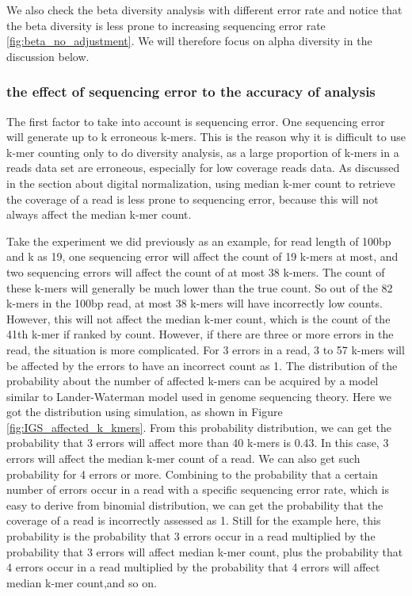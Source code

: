 \documentclass{article}
\begin{document}
We also check the beta diversity analysis with different error rate and notice
that the beta diversity is less prone to increasing sequencing error rate \ref{fig:beta_no_adjustment}. We 
will therefore focus on alpha diversity in the discussion below.

\subsubsection{the effect of sequencing error to the accuracy of analysis}

The first factor to take into account is sequencing error. One sequencing error
will generate up to k erroneous k-mers. This is the reason why it is difficult to use
k-mer counting only to do diversity analysis, as a large proportion of k-mers
in a reads data set are erroneous, especially for low coverage reads data. As
discussed in the section about digital normalization, using median k-mer count
to retrieve the coverage of a read is less prone to sequencing error, because
this will not always affect the median k-mer count. 

Take the experiment we did
previously as an example, for read length of 100bp and k as 19, one sequencing
error will affect the count of 19 k-mers at most, and two sequencing errors
will affect the count of at most 38 k-mers. The count of these k-mers will
generally be much lower than the true count. So out of the 82 k-mers
in the 100bp read, at most 38 k-mers will have incorrectly low counts. However, this
will not affect the median k-mer count, which is the count of the 41th k-mer if
ranked by count. However, if there are three or more errors in the read, the 
situation is more complicated. For 3 errors in a read, 3 to 57 k-mers
will be affected by the errors to have an incorrect count as 1. The 
distribution of the probability about the number of affected k-mers can be
acquired by a model similar to Lander-Waterman model used in genome sequencing
 theory. Here we got the distribution using simulation, as shown in Figure
\ref{fig:IGS_affected_k_kmers}. From this probability distribution, we can get
the probability that 3 errors will affect more than 40 k-mers is 0.43. In this
case, 3 errors will affect the median k-mer count of a read. We can also get 
such probability for 4 errors or more. Combining to the probability that a
certain number of errors occur in a read with a specific sequencing error rate,
which is easy to derive from binomial distribution, we can get the probability
that the coverage of a read is incorrectly assessed as 1. Still for the example
here, this probability is the probability that 3 errors occur in a read
multiplied by the probability that 3 errors will affect median k-mer count,
plus the probability that 4 errors occur in a read multiplied by the 
probability that 4 errors will affect median k-mer count,and so on.
\end{document}
